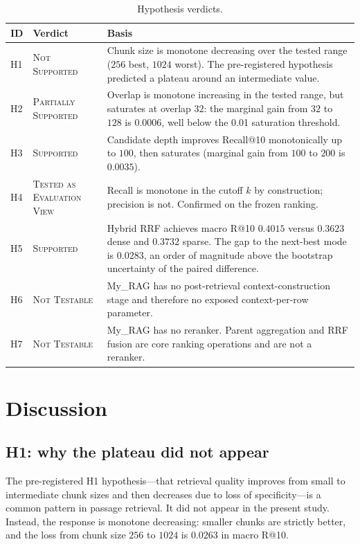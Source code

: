 \documentclass[11pt,a4paper]{article}
\begin{document}
\begin{table}[h]
\centering
\caption{Hypothesis verdicts.}
\label{tab:hypotheses}
\small
\begin{tabular}{l l p{7.5cm}}
\toprule
\textbf{ID} & \textbf{Verdict} & \textbf{Basis} \\
\midrule
H1 & \textsc{Not Supported} &
  Chunk size is monotone decreasing over the tested range
  ($256$ best, $1024$ worst). The pre-registered hypothesis
  predicted a plateau around an intermediate value. \\
H2 & \textsc{Partially Supported} &
  Overlap is monotone increasing in the tested range, but saturates
  at overlap $32$: the marginal gain from $32$ to $128$ is
  $\num{0.0006}$, well below the \num{0.01} saturation threshold. \\
H3 & \textsc{Supported} &
  Candidate depth improves Recall@10 monotonically up to $100$, then
  saturates (marginal gain from $100$ to $200$ is $\num{0.0035}$). \\
H4 & \textsc{Tested as Evaluation View} &
  Recall is monotone in the cutoff $k$ by construction; precision is
  not. Confirmed on the frozen ranking. \\
H5 & \textsc{Supported} &
  Hybrid RRF achieves macro R@10 $\num{0.4015}$ versus
  $\num{0.3623}$ dense and $\num{0.3732}$ sparse. The gap to the
  next-best mode is $\num{0.0283}$, an order of magnitude above the
  bootstrap uncertainty of the paired difference. \\
H6 & \textsc{Not Testable} &
  My\_RAG has no post-retrieval context-construction stage and
  therefore no exposed context-per-row parameter. \\
H7 & \textsc{Not Testable} &
  My\_RAG has no reranker. Parent aggregation and RRF fusion are
  core ranking operations and are not a reranker. \\
\bottomrule
\end{tabular}
\end{table}

\section{Discussion}

\subsection{H1: why the plateau did not appear}
The pre-registered H1 hypothesis---that retrieval quality improves
from small to intermediate chunk sizes and then decreases due to loss
of specificity---is a common pattern in passage retrieval. It did not
appear in the present study. Instead, the response is monotone
decreasing: smaller chunks are strictly better, and the loss from
chunk size $256$ to $1024$ is $\num{0.0263}$ in macro R@10.
\end{document}
